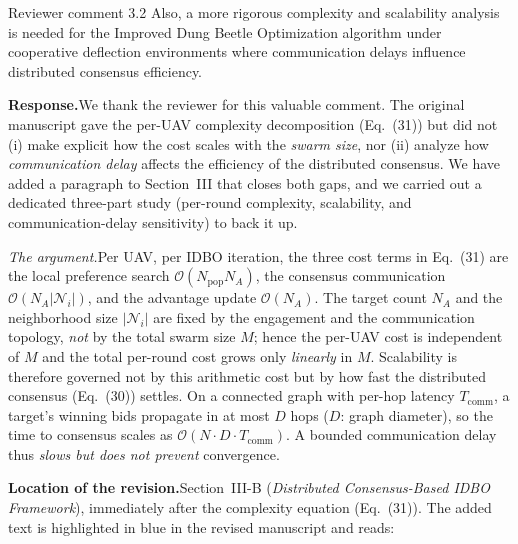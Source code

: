 \documentclass[11pt]{article}
\newcommand{\rsp}{\medskip\noindent\textbf{Response.}\quad}
\newcommand{\loc}{\medskip\noindent\textbf{Location of the revision.}\quad}
\begin{document}
\begin{reviewercomment}{Reviewer comment 3.2}
Also, a more rigorous complexity and scalability analysis is needed for the
Improved Dung Beetle Optimization algorithm under cooperative deflection
environments where communication delays influence distributed consensus
efficiency.
\end{reviewercomment}

\rsp We thank the reviewer for this valuable comment. The original manuscript gave
the per-UAV complexity decomposition (Eq.~(31)) but did not (i) make explicit how
the cost scales with the \emph{swarm size}, nor (ii) analyze how
\emph{communication delay} affects the efficiency of the distributed consensus. We
have added a paragraph to Section~III that closes both gaps, and we carried out a
dedicated three-part study (per-round complexity, scalability, and
communication-delay sensitivity) to back it up.

\medskip
\noindent\emph{The argument.}\quad Per UAV, per IDBO iteration, the three cost
terms in Eq.~(31) are the local preference search
$\mathcal{O}(N_{\mathrm{pop}}N_A)$, the consensus communication
$\mathcal{O}(N_A\lvert\mathcal{N}_i\rvert)$, and the advantage update
$\mathcal{O}(N_A)$. The target count $N_A$ and the neighborhood size
$\lvert\mathcal{N}_i\rvert$ are fixed by the engagement and the communication
topology, \emph{not} by the total swarm size $M$; hence the per-UAV cost is
independent of $M$ and the total per-round cost grows only \emph{linearly} in $M$.
Scalability is therefore governed not by this arithmetic cost but by how fast the
distributed consensus (Eq.~(30)) settles. On a connected graph with per-hop latency
$T_{\mathrm{comm}}$, a target's winning bids propagate in at most $D$ hops ($D$: graph
diameter), so the time to consensus scales as
$\mathcal{O}(N\!\cdot\!D\!\cdot\!T_{\mathrm{comm}})$. A bounded communication delay
thus \emph{slows but does not prevent} convergence.

\loc Section~III-B (\emph{Distributed Consensus-Based IDBO Framework}),
immediately after the complexity equation (Eq.~(31)). The added text is highlighted
in blue in the revised manuscript and reads:
\end{document}
